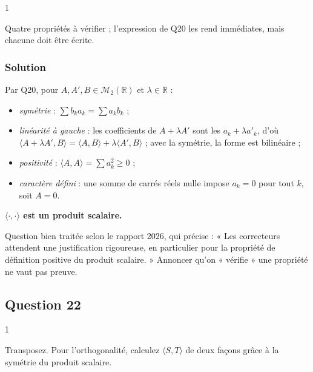 \documentclass[11pt,a4paper]{article}
\providecommand{\tightlist}{\setlength{\itemsep}{0pt}\setlength{\parskip}{0pt}}
\begin{document}
\begin{indication}{1}

Quatre propriétés à vérifier ; l'expression de Q20 les rend immédiates, mais chacune doit être écrite.

\end{indication}

\hypertarget{solution-20}{%
\subsubsection{Solution}\label{solution-20}}

Par Q20, pour \(A,A',B\in\mathcal M_2(\mathbb R)\) et \(\lambda\in\mathbb R\) :

\begin{itemize}
\tightlist
\item
  \emph{symétrie} : \(\sum b_ka_k=\sum a_kb_k\) ;
\item
  \emph{linéarité à gauche} : les coefficients de \(A+\lambda A'\) sont les \(a_k+\lambda a'_k\), d'où \(\langle A+\lambda A',\allowbreak B\rangle=\langle A,\allowbreak B\rangle+\lambda\langle A',\allowbreak B\rangle\) ; avec la symétrie, la forme est bilinéaire ;
\item
  \emph{positivité} : \(\langle A,A\rangle=\sum a_k^2\ge0\) ;
\item
  \emph{caractère défini} : une somme de carrés réels nulle impose \(a_k=0\) pour tout \(k\), soit \(A=0\).
\end{itemize}

\textbf{\(\langle\cdot,\cdot\rangle\) est un produit scalaire.}

\begin{jury}

Question bien traitée selon le rapport 2026, qui précise : « Les correcteurs attendent une justification rigoureuse, en particulier pour la propriété de définition positive du produit scalaire. » Annoncer qu'on « vérifie » une propriété ne vaut pas preuve.

\end{jury}

\hypertarget{question-22}{%
\subsection{Question 22}\label{question-22}}

\begin{indication}{1}

Transposez. Pour l'orthogonalité, calculez \(\langle S,T\rangle\) de deux façons grâce à la symétrie du produit scalaire.

\end{indication}
\end{document}

